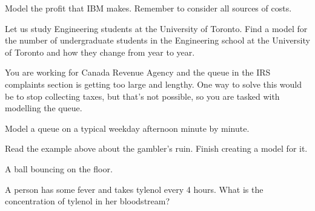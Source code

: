 \begin{exercises}
\begin{problist}
			Model the profit that IBM makes. Remember to consider all sources of costs.
	
	\prob Let us study Engineering students at the University of Toronto. Find a model for the number of undergraduate students in the Engineering school at the University of Toronto and how they change from year to year. 

	\prob You are working for Canada Revenue Agency and the queue in the IRS complaints section is getting too large and lengthy. One way to solve this would be to stop collecting taxes, but that's not possible, so you are tasked with modelling the queue. 

			Model a queue on a typical weekday afternoon minute by minute. 


	
	\prob Read the example above about the gambler's ruin. Finish creating a model for it.

	\prob A ball bouncing on the floor.
	
	\prob A person has some fever and takes tylenol every 4 hours. What is the concentration of tylenol in her bloodstream?
	
	\end{problist}
\end{exercises}
